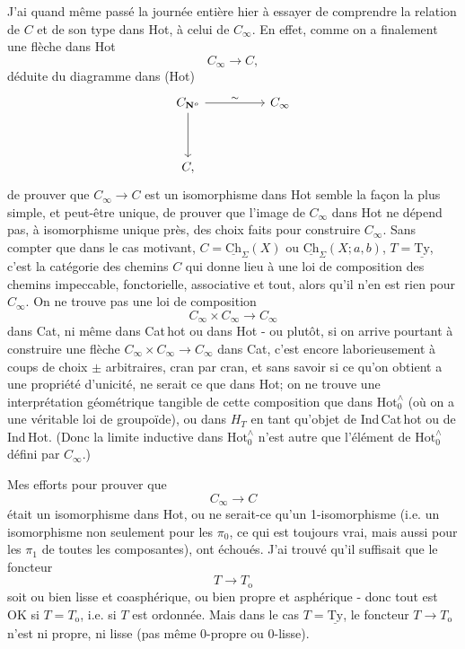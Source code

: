 \documentclass[11pt]{article}
\newcommand{\printedpage}[1]{\marginpar{\footnotesize p.~#1}}
\newcommand{\msp}[1]{\marginpar{\vspace*{10pt}\footnotesize [#1]}}
\newcommand{\Ch}{\underline{\mathrm{Ch}}}
\newcommand{\Ty}{\underline{\mathrm{Ty}}}
\newcommand{\Hotz}{\mathrm{Hot}^{\wedge}_{0}}
\newcommand{\CNo}{C_{\mathbf{N}^{o}}}
\begin{document}
J'ai quand même passé la journée entière hier à essayer de comprendre la relation de $C$ et de son type dans Hot, à celui de $C_{\infty}$. En effet, comme on a finalement une flèche dans Hot
\[
C_{\infty} \longrightarrow C,
\]
déduite du diagramme dans (Hot)
\[
\begin{tikzcd}[column sep=huge, row sep=huge]
\CNo \arrow[r, "\sim"] \arrow[d] & C_{\infty} \\
C, &
\end{tikzcd}
\]
de prouver que $C_{\infty} \longrightarrow C$ est un isomorphisme dans Hot
\msp{page 111}
semble la façon la plus simple, et peut-être unique, de prouver que l'image de $C_{\infty}$ dans Hot ne dépend pas, à isomorphisme unique près, des choix faits pour construire $C_{\infty}$. Sans compter que dans le cas motivant, $C = \Ch_{\Sigma}(X)$ ou $\Ch_{\Sigma}(X;a,b)$, $T = \Ty$, c'est la catégorie des chemins $C$ qui donne lieu à une loi de composition des chemins impeccable, fonctorielle, associative et tout, alors qu'il n'en est rien pour $C_{\infty}$. On ne trouve pas une loi de composition
\[
C_{\infty} \times C_{\infty} \longrightarrow C_{\infty}
\]
dans Cat, ni même dans Cat\,hot ou dans Hot - ou plutôt, si on arrive pourtant à construire une flèche $C_{\infty} \times C_{\infty} \longrightarrow C_{\infty}$ dans Cat, c'est encore laborieusement à coups de choix $\pm$ arbitraires, cran par cran, et sans savoir si ce qu'on obtient a une propriété d'unicité, ne serait ce que dans Hot; on ne trouve une interprétation géométrique tangible de cette composition que dans $\Hotz$ (où on a une véritable loi de groupoïde), ou dans $H_{T}$ en tant qu'objet de Ind\,Cat\,hot
\printedpage{71}
\msp{page 112}
ou de Ind\,Hot. (Donc la limite inductive dans $\Hotz$ n'est autre que l'élément de $\Hotz$ défini par $C_{\infty}$.)

Mes efforts pour prouver que
\[
C_{\infty} \longrightarrow C
\]
était un isomorphisme dans Hot, ou ne serait-ce qu'un 1-isomorphisme (i.e. un isomorphisme non seulement pour les $\pi_{0}$, ce qui est toujours vrai, mais aussi pour les $\pi_{1}$ de toutes les composantes), ont échoués. J'ai trouvé qu'il suffisait que le foncteur %
\[
T \longrightarrow T_{\mathrm{o}}
\]
soit ou bien lisse et coasphérique, ou bien propre et asphérique - donc tout est OK si $T = T_{\mathrm{o}}$, i.e. si $T$ est ordonnée. Mais dans le cas $T = \Ty$, le foncteur $T \longrightarrow T_{\mathrm{o}}$ n'est ni propre, ni lisse (pas même 0-propre ou 0-lisse).
\end{document}

